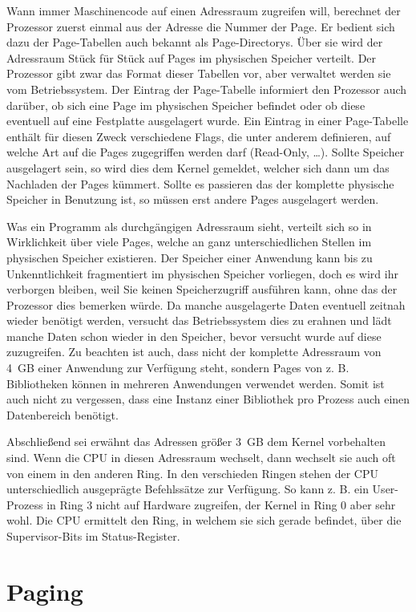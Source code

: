 \documentclass[12pt]{book}
\begin{document}
Wann immer Maschinencode auf einen Adressraum zugreifen will, berechnet der
Prozessor zuerst einmal aus der Adresse die Nummer der Page. Er bedient sich
dazu der Page-Tabellen auch bekannt als Page-Directorys. Über sie wird der
Adressraum Stück für Stück auf Pages im physischen Speicher verteilt. Der
Prozessor gibt zwar das Format dieser Tabellen vor, aber verwaltet werden sie
vom Betriebssystem. Der Eintrag der Page-Tabelle informiert den Prozessor auch
darüber, ob sich eine Page im physischen Speicher befindet oder ob diese
eventuell auf eine Festplatte ausgelagert wurde. Ein Eintrag in einer
Page-Tabelle enthält für diesen Zweck verschiedene Flags, die unter anderem
definieren, auf welche Art auf die Pages zugegriffen werden darf (Read-Only, …).
Sollte Speicher ausgelagert sein, so wird dies dem Kernel gemeldet, welcher
sich dann um das Nachladen der Pages kümmert. Sollte es passieren das der
komplette physische Speicher in Benutzung ist, so müssen erst andere Pages
ausgelagert werden.

Was ein Programm als durchgängigen Adressraum sieht, verteilt sich so in
Wirklichkeit über viele Pages, welche an ganz unterschiedlichen Stellen im
physischen Speicher existieren. Der Speicher einer Anwendung kann bis zu
Unkenntlichkeit fragmentiert im physischen Speicher vorliegen, doch es wird ihr
verborgen bleiben, weil Sie keinen Speicherzugriff ausführen kann, ohne das der
Prozessor dies bemerken würde. Da manche ausgelagerte Daten eventuell zeitnah
wieder benötigt werden, versucht das Betriebssystem dies zu erahnen und lädt
manche Daten schon wieder in den Speicher, bevor versucht wurde auf diese
zuzugreifen. Zu beachten ist auch, dass nicht der komplette Adressraum von 4 GB
einer Anwendung zur Verfügung steht, sondern Pages von z. B. Bibliotheken
können in mehreren Anwendungen verwendet werden. Somit ist auch nicht zu
vergessen, dass eine Instanz einer Bibliothek pro Prozess auch einen
Datenbereich benötigt.

Abschließend sei erwähnt das Adressen größer 3 GB dem Kernel vorbehalten sind.
Wenn die CPU in diesen Adressraum wechselt, dann wechselt sie auch oft von einem
in den anderen Ring. In den verschieden Ringen stehen der CPU unterschiedlich
ausgeprägte Befehlssätze zur Verfügung. So kann z. B. ein User-Prozess in Ring 3
nicht auf Hardware zugreifen, der Kernel in Ring 0 aber sehr wohl. Die CPU
ermittelt den Ring, in welchem sie sich gerade befindet, über die
Supervisor-Bits im Status-Register.

\section{Paging}
\end{document}
